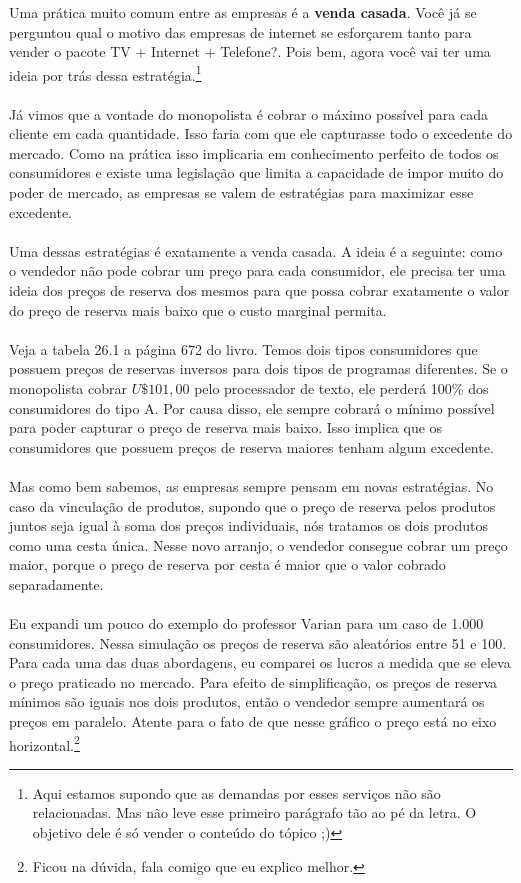 \documentclass[a4paper,11pt,oneside]{book}
\theoremstyle{definition}
\theoremstyle{break}
\begin{document}
Uma prática muito comum entre as empresas é a \textbf{venda casada}. Você já se perguntou qual o motivo das empresas de internet se esforçarem tanto para vender o pacote TV + Internet + Telefone?. Pois bem, agora você vai ter uma ideia por trás dessa estratégia.\footnote{Aqui estamos supondo que as demandas por esses serviços não são relacionadas. Mas não leve esse primeiro parágrafo tão ao pé da letra. O objetivo dele é só vender o conteúdo do tópico ;)}
\\
\\
Já vimos que a vontade do monopolista é cobrar o máximo possível para cada cliente em cada quantidade. Isso faria com que ele capturasse todo o excedente do mercado. Como na prática isso implicaria em conhecimento perfeito de todos os consumidores e existe uma legislação que limita a capacidade de impor muito do poder de mercado, as empresas se valem de estratégias para maximizar esse excedente.
\\
\\
Uma dessas estratégias é exatamente a venda casada. A ideia é a seguinte: como o vendedor não pode cobrar um preço para cada consumidor, ele precisa ter uma ideia dos preços de reserva dos mesmos para que possa cobrar exatamente o valor do preço de reserva mais baixo que o custo marginal permita.
\\
\\
Veja a tabela 26.1 a página 672 do livro. Temos dois tipos consumidores que possuem preços de reservas inversos para dois tipos de programas diferentes. Se o monopolista cobrar $U\$ 101,00$ pelo processador de texto, ele perderá 100\% dos consumidores do tipo A. Por causa disso, ele sempre cobrará o mínimo possível para poder capturar o preço de reserva mais baixo. Isso implica que os consumidores que possuem preços de reserva maiores tenham algum excedente.
\\
\\
Mas como bem sabemos, as empresas sempre pensam em novas estratégias. No caso da vinculação de produtos, supondo que o preço de reserva pelos produtos juntos seja igual à soma dos preços individuais, nós tratamos os dois produtos como uma cesta única. Nesse novo arranjo, o vendedor consegue cobrar um preço maior, porque o preço de reserva por cesta é maior que o valor cobrado separadamente.
\\
\\
Eu expandi um pouco do exemplo do professor Varian para um caso de 1.000 consumidores. Nessa simulação os preços de reserva são aleatórios entre 51 e 100. Para cada uma das duas abordagens, eu comparei os lucros a medida que se eleva o preço praticado no mercado. Para efeito de simplificação, os preços de reserva mínimos são iguais nos dois produtos, então o vendedor sempre aumentará os preços em paralelo. Atente para o fato de que nesse gráfico o preço está no eixo horizontal.\footnote{Ficou na dúvida, fala comigo que eu explico melhor.}
\end{document}
